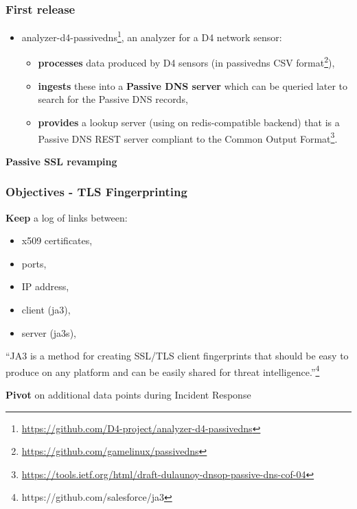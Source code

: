 \documentclass{beamer}
\begin{document}
\begin{frame}
        \frametitle{First release}

 \begin{itemize}
         \item[\checkmark]
           analyzer-d4-passivedns\footnote{\url{https://github.com/D4-project/analyzer-d4-passivedns}}, an analyzer for a D4 network sensor:

           \begin{itemize}
           \item {\bf processes} data produced by D4 sensors (in passivedns CSV format\footnote{\url{https://github.com/gamelinux/passivedns}}),
           
         \item{\bf ingests} these into a {\bf Passive DNS server} which can be queried later to search for the Passive DNS records,

         \item{\bf provides} a lookup server (using on
           redis-compatible backend) that is a Passive DNS REST server compliant to the Common Output Format\footnote{\url{https://tools.ietf.org/html/draft-dulaunoy-dnsop-passive-dns-cof-04}}.
         \end{itemize}
\end{itemize}
\end{frame}

\begin{frame}
  \begin{center}
    {\bf Passive SSL revamping}
  \end{center}
\end{frame}

\begin{frame}
  \frametitle{Objectives - TLS Fingerprinting}
        {\bf Keep} a log of links between:
        \begin{itemize}
          \item x509 certificates,
          \item ports,
          \item IP address,
          \item client (ja3),
          \item server (ja3s),
        \end{itemize}
        \begin{displayquote}
        ``JA3 is a method for creating SSL/TLS client fingerprints that should be easy to produce on any platform and can be easily shared for threat intelligence.''\footnote{https://github.com/salesforce/ja3}
        \end{displayquote}

         {\bf Pivot} on additional data points during Incident Response 
\end{frame}
\end{document}
